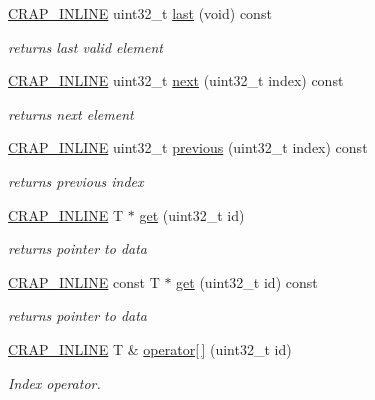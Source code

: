 \begin{DoxyCompactItemize}
\hyperlink{config__x86_8h_a5a40526b8d842e7ff731509998bb0f1c}{C\+R\+A\+P\+\_\+\+I\+N\+L\+I\+N\+E} uint32\+\_\+t \hyperlink{classcrap_1_1indexed__array_ac715421267db850e0b50fd43a4c0bd76}{last} (void) const 
\begin{DoxyCompactList}\small\item\em returns last valid element \end{DoxyCompactList}\item 
\hyperlink{config__x86_8h_a5a40526b8d842e7ff731509998bb0f1c}{C\+R\+A\+P\+\_\+\+I\+N\+L\+I\+N\+E} uint32\+\_\+t \hyperlink{classcrap_1_1indexed__array_a3ef6beea7d33b6bad387497833c62a18}{next} (uint32\+\_\+t index) const 
\begin{DoxyCompactList}\small\item\em returns next element \end{DoxyCompactList}\item 
\hyperlink{config__x86_8h_a5a40526b8d842e7ff731509998bb0f1c}{C\+R\+A\+P\+\_\+\+I\+N\+L\+I\+N\+E} uint32\+\_\+t \hyperlink{classcrap_1_1indexed__array_ace250954282e768fde057d53fbba9f28}{previous} (uint32\+\_\+t index) const 
\begin{DoxyCompactList}\small\item\em returns previous index \end{DoxyCompactList}\item 
\hyperlink{config__x86_8h_a5a40526b8d842e7ff731509998bb0f1c}{C\+R\+A\+P\+\_\+\+I\+N\+L\+I\+N\+E} T $\ast$ \hyperlink{classcrap_1_1indexed__array_a269b17c858dd7ebd72db65f0d83d0046}{get} (uint32\+\_\+t id)
\begin{DoxyCompactList}\small\item\em returns pointer to data \end{DoxyCompactList}\item 
\hyperlink{config__x86_8h_a5a40526b8d842e7ff731509998bb0f1c}{C\+R\+A\+P\+\_\+\+I\+N\+L\+I\+N\+E} const T $\ast$ \hyperlink{classcrap_1_1indexed__array_ab6d8b2c449fcbf9c0e31f01616c104e7}{get} (uint32\+\_\+t id) const 
\begin{DoxyCompactList}\small\item\em returns pointer to data \end{DoxyCompactList}\item 
\hyperlink{config__x86_8h_a5a40526b8d842e7ff731509998bb0f1c}{C\+R\+A\+P\+\_\+\+I\+N\+L\+I\+N\+E} T \& \hyperlink{classcrap_1_1indexed__array_aab15cf4e755310e6c3b05977de4cdab5}{operator\mbox{[}$\,$\mbox{]}} (uint32\+\_\+t id)
\begin{DoxyCompactList}\small\item\em Index operator. \end{DoxyCompactList}\item 

\end{DoxyCompactItemize}
